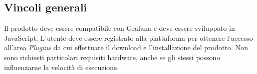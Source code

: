 \subsection{Vincoli generali}
Il prodotto deve essere compatibile con Grafana e deve essere sviluppato in JavaScript. L'utente deve essere registrato alla piattaforma per ottenere l'accesso all'area \emph{Plugins} da cui effettuare il download e l'installazione del prodotto. Non sono richiesti particolari requisiti hardware, anche se gli stessi possono influenzarne la velocità di esecuzione.

\pagebreak